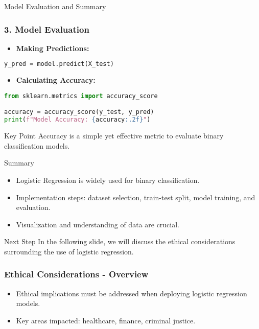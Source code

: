 \documentclass[aspectratio=169]{beamer}
\begin{document}
\begin{frame}{Model Evaluation and Summary}
    \frametitle{3. Model Evaluation}
    \begin{itemize}
        \item \textbf{Making Predictions:}
    \end{itemize}
    \begin{lstlisting}[language=Python]
y_pred = model.predict(X_test)
    \end{lstlisting}
    \begin{itemize}
        \item \textbf{Calculating Accuracy:}
    \end{itemize}
    \begin{lstlisting}[language=Python]
from sklearn.metrics import accuracy_score

accuracy = accuracy_score(y_test, y_pred)
print(f"Model Accuracy: {accuracy:.2f}")
    \end{lstlisting}
    \begin{block}{Key Point}
        Accuracy is a simple yet effective metric to evaluate binary classification models.
    \end{block}
    
    \begin{block}{Summary}
        \begin{itemize}
            \item Logistic Regression is widely used for binary classification.
            \item Implementation steps: dataset selection, train-test split, model training, and evaluation.
            \item Visualization and understanding of data are crucial.
        \end{itemize}
    \end{block}
    
    \begin{block}{Next Step}
        In the following slide, we will discuss the ethical considerations surrounding the use of logistic regression.
    \end{block}
\end{frame}

\begin{frame}[fragile]
    \frametitle{Ethical Considerations - Overview}
    \begin{itemize}
        \item Ethical implications must be addressed when deploying logistic regression models.
        \item Key areas impacted: healthcare, finance, criminal justice.
    \end{itemize}
\end{frame}
\end{document}
